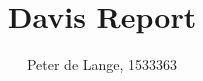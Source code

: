 \documentclass[a4paper,11pt]{report}
\begin{document}
\title{\bf Davis Report}
\author{Peter de Lange, 1533363}
\renewcommand{\today}{February, 2011}
\maketitle
\thispagestyle{fancy}
\pagestyle{fancy}
\headheight 40pt
\tableofcontents
 
 
 
 
 
 
 
 
\end{document}
